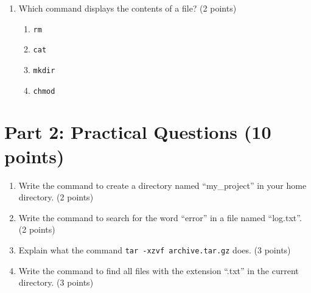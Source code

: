 \documentclass[11pt,a4paper]{article}
\begin{document}
{\begin{enumerate}[label=\textbf{\arabic*.}]
    \item Which command displays the contents of a file? (2 points)
    \begin{enumerate}[label=(\alph*)]
        \item \texttt{rm}
        \item \texttt{cat}
        \item \texttt{mkdir}
        \item \texttt{chmod}
    \end{enumerate}
\end{enumerate}

\section*{Part 2: Practical Questions (10 points)}

\begin{enumerate}[label=\textbf{\arabic*.}, resume]
    \item Write the command to create a directory named ``my\_project'' in your home directory. (2 points)
    
    \vspace{2cm}
    
    \item Write the command to search for the word ``error'' in a file named ``log.txt''. (2 points)
    
    \vspace{2cm}
    
    \item Explain what the command \texttt{tar -xzvf archive.tar.gz} does. (3 points)
    
    \vspace{3cm}
    
    \item Write the command to find all files with the extension ``.txt'' in the current directory. (3 points)
    
    \vspace{3cm}
\end{enumerate}
}
\end{document}
